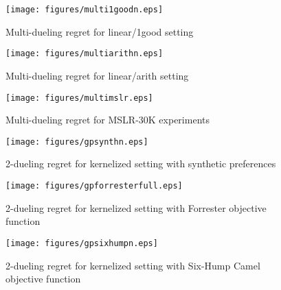 \begin{figure}[t]
\centering
\texttt{[image: figures/multi1goodn.eps]}
\vspace{-0.1in}
\caption{Multi-dueling regret for linear/1good setting}
\label{fig:multi1good}
\vspace{-0.1in}
\end{figure}

\begin{figure}[t]
\centering
\texttt{[image: figures/multiarithn.eps]}
\vspace{-0.1in}
\caption{Multi-dueling regret for linear/arith setting}
\label{fig:multiarith}
\vspace{-0.05in}
\end{figure}




\begin{figure}[t]
\centering
\texttt{[image: figures/multimslr.eps]}
\vspace{-0.1in}
\caption{Multi-dueling regret for MSLR-30K experiments}
\vspace{-0.14in}
\label{fig:multimslr}
\end{figure}

\begin{figure}[b]
\centering
\texttt{[image: figures/gpsynthn.eps]}
\vspace{-0.15in}
\caption{2-dueling regret for kernelized setting with synthetic preferences}
\vspace{-0.05in}
\label{fig:gpsynthetic}
\end{figure}

\begin{figure}[t]
\centering
\texttt{[image: figures/gpforresterfull.eps]}
\vspace{-0.1in}
\caption{2-dueling regret for kernelized setting with Forrester objective function}
\vspace{-0.05in}
\label{fig:gpforrester}
\end{figure}

\begin{figure}[t]
\centering
\texttt{[image: figures/gpsixhumpn.eps]}
\vspace{-0.1in}
\caption{2-dueling regret for kernelized setting with Six-Hump Camel objective function}
\vspace{-0.1in}
\label{fig:gpsixhump}
\end{figure}

